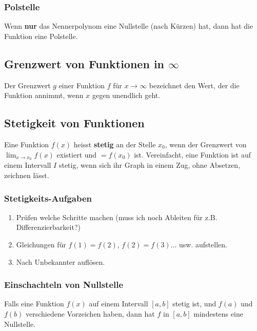 \subsubsection{Polstelle}
Wenn \textbf{nur} das Nennerpolynom eine Nullstelle (nach Kürzen) hat, dann hat die Funktion eine Polstelle.
\begin{center}
\end{center}
\subsection{Grenzwert von Funktionen in $\infty$}
Der Grenzwert $g$ einer Funktion $f$ für $x \to \infty$ bezeichnet den Wert, der die Funktion annimmt, 
wenn $x$ gegen unendlich geht.
\subsection{Stetigkeit von Funktionen}
Eine Funktion $f(x)$ heisst \textbf{stetig} an der Stelle $x_0$, wenn der Grenzwert von 
$\lim_{x \to x_0} f(x)$ existiert und $= f(x_0)$ ist. Vereinfacht, eine Funktion ist auf einem Intervall 
$I$ stetig, wenn sich ihr Graph in einem Zug, ohne Absetzen, zeichnen lässt.
\subsubsection{Stetigkeits-Aufgaben}
\begin{enumerate}
    \item Prüfen welche Schritte machen (muss ich noch Ableiten für z.B. Differenzierbarkeit?)
    \item Gleichungen für $f(1) = f(2)$, $f(2) = f(3)$... usw. aufstellen.
    \item Nach Unbekannter auflösen.
\end{enumerate}
\subsubsection{Einschachteln von Nullstelle}
Falls eine Funktion $f(x)$ auf einem Intervall $[a, b]$ stetig ist, und $f(a)$ und $f(b)$ verschiedene
Vorzeichen haben, dann hat $f$ in $[a, b]$ mindestens eine Nullstelle.